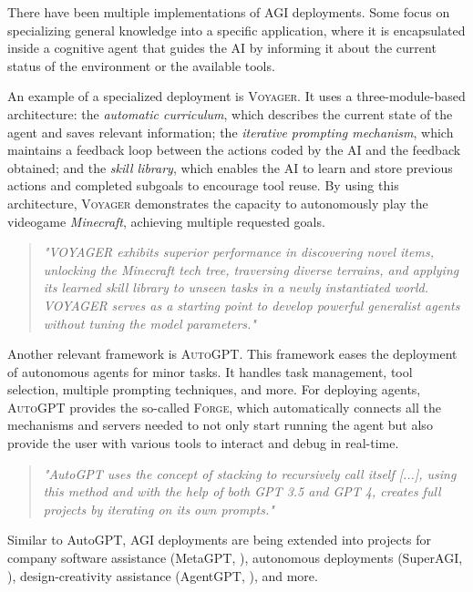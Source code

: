 There have been multiple implementations of AGI deployments. Some focus on
specializing general knowledge into a specific application, where it is
encapsulated inside a cognitive agent that guides the AI by informing it about
the current status of the environment or the available tools.

An example of a specialized deployment is \textsc{Voyager}. It uses a
three-module-based architecture: the \emph{automatic curriculum}, which
describes the current state of the agent and saves relevant information; the
\emph{iterative prompting mechanism}, which maintains a feedback loop between
the actions coded by the AI and the feedback obtained; and the \emph{skill
library}, which enables the AI to learn and store previous actions and completed
subgoals to encourage tool reuse. By using this architecture, \textsc{Voyager}
demonstrates the capacity to autonomously play the videogame
\emph{Minecraft}, achieving multiple requested goals.


\begin{quote}
    \small\textit{
        "VOYAGER exhibits superior performance in discovering novel items,
        unlocking the Minecraft tech tree, traversing diverse terrains, and
        applying its learned skill library to unseen tasks in a newly
        instantiated world. VOYAGER serves as a starting point to develop
        powerful generalist agents without tuning the model parameters."
        \citet{wang2023voyager}
    }
\end{quote}

Another relevant framework is \textsc{AutoGPT}. This framework eases the
deployment of autonomous agents for minor tasks. It handles task management,
tool selection, multiple prompting techniques, and more. For deploying agents,
\textsc{AutoGPT} provides the so-called \textsc{Forge}, which automatically
connects all the mechanisms and servers needed to not only start running the
agent but also provide the user with various tools to interact and debug in
real-time.


\begin{quote}
    \small\textit{
        "AutoGPT uses the concept of stacking to recursively call itself  [...],
        using this method and with the help of both GPT 3.5 and GPT 4, creates
        full projects by iterating on its own prompts." \citet{fezari2023gpt}
    }
\end{quote}

Similar to AutoGPT, AGI deployments are being extended into projects for company
software assistance (MetaGPT, \cite{alexander2023metagpt}), autonomous
deployments (SuperAGI, \cite{transformer2023superagi}), design-creativity
assistance (AgentGPT, \cite{reworkd2023agentgpt}), and more.

